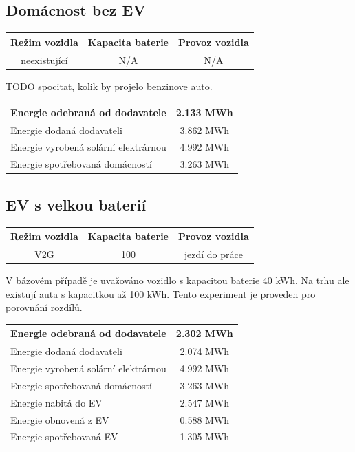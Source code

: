 \documentclass[12pt,a4paper]{article}
\begin{document}
\subsection{Domácnost bez EV}

\bigskip
\begin{tabular}{ | c | c | c | }
\hline
Režim vozidla & Kapacita baterie & Provoz vozidla \\
\hline
neexistující & N/A & N/A \\
\hline
\end{tabular}
\bigskip

TODO spocitat, kolik by projelo benzinove auto.

\bigskip
\begin{tabular}{ | l | c | }
\hline
Energie odebraná od dodavatele & 2.133 MWh \\
\hline
Energie dodaná dodavateli &  3.862 MWh \\
\hline
Energie vyrobená solární elektrárnou & 4.992 MWh \\
\hline
Energie spotřebovaná domácností & 3.263 MWh \\
\hline
\end{tabular}
\bigskip


\subsection{EV s velkou baterií}

\bigskip
\begin{tabular}{ | c | c | c | }
\hline
Režim vozidla & Kapacita baterie & Provoz vozidla \\
\hline
V2G & 100 & jezdí do práce \\
\hline
\end{tabular}
\bigskip

V bázovém případě je uvažováno vozidlo s kapacitou baterie 40 kWh.
Na trhu ale existují auta s kapacitkou až 100 kWh.
Tento experiment je proveden pro porovnání rozdílů.

\bigskip
\begin{tabular}{ | l | c | }
\hline
Energie odebraná od dodavatele & 2.302 MWh \\
\hline
Energie dodaná dodavateli & 2.074 MWh \\
\hline
Energie vyrobená solární elektrárnou & 4.992 MWh \\
\hline
Energie spotřebovaná domácností & 3.263 MWh \\
\hline
Energie nabitá do EV & 2.547 MWh \\
\hline
Energie obnovená z EV & 0.588 MWh \\
\hline
Energie spotřebovaná EV & 1.305 MWh \\
\hline
\end{tabular}
\bigskip
\end{document}
